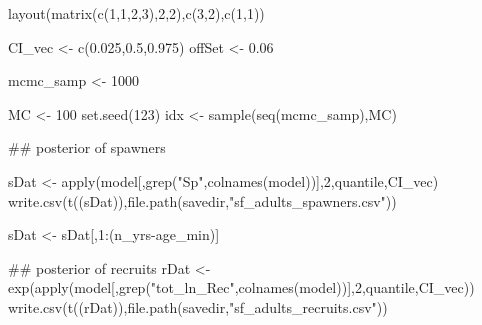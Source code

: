 \documentclass[
  11pt,
]{article}
\newenvironment{Shaded}{}{}
\newcommand{\CommentTok}[1]{\textcolor[rgb]{0.00,0.50,0.00}{#1}}
\newcommand{\DecValTok}[1]{#1}
\newcommand{\FloatTok}[1]{#1}
\newcommand{\KeywordTok}[1]{\textcolor[rgb]{0.00,0.00,1.00}{#1}}
\newcommand{\NormalTok}[1]{#1}
\newcommand{\OperatorTok}[1]{#1}
\newcommand{\StringTok}[1]{\textcolor[rgb]{0.00,0.50,0.50}{#1}}
\begin{document}
\begin{Shaded}
\begin{Highlighting}[]
\KeywordTok{layout}\NormalTok{(}\KeywordTok{matrix}\NormalTok{(}\KeywordTok{c}\NormalTok{(}\DecValTok{1}\NormalTok{,}\DecValTok{1}\NormalTok{,}\DecValTok{2}\NormalTok{,}\DecValTok{3}\NormalTok{),}\DecValTok{2}\NormalTok{,}\DecValTok{2}\NormalTok{),}\KeywordTok{c}\NormalTok{(}\DecValTok{3}\NormalTok{,}\DecValTok{2}\NormalTok{),}\KeywordTok{c}\NormalTok{(}\DecValTok{1}\NormalTok{,}\DecValTok{1}\NormalTok{))}


\NormalTok{CI_vec <-}\StringTok{ }\KeywordTok{c}\NormalTok{(}\FloatTok{0.025}\NormalTok{,}\FloatTok{0.5}\NormalTok{,}\FloatTok{0.975}\NormalTok{)}
\NormalTok{offSet <-}\StringTok{ }\FloatTok{0.06}

\NormalTok{mcmc_samp <-}\StringTok{ }\DecValTok{1000}

\NormalTok{MC <-}\StringTok{ }\DecValTok{100}
\KeywordTok{set.seed}\NormalTok{(}\DecValTok{123}\NormalTok{)}
\NormalTok{idx <-}\StringTok{ }\KeywordTok{sample}\NormalTok{(}\KeywordTok{seq}\NormalTok{(mcmc_samp),MC)}

\CommentTok{## posterior of spawners}

\NormalTok{sDat <-}\StringTok{ }\KeywordTok{apply}\NormalTok{(model[,}\KeywordTok{grep}\NormalTok{(}\StringTok{"Sp"}\NormalTok{,}\KeywordTok{colnames}\NormalTok{(model))],}\DecValTok{2}\NormalTok{,quantile,CI_vec)}
\KeywordTok{write.csv}\NormalTok{(}\KeywordTok{t}\NormalTok{((sDat)),}\KeywordTok{file.path}\NormalTok{(savedir,}\StringTok{"sf_adults_spawners.csv"}\NormalTok{))}

\NormalTok{sDat <-}\StringTok{ }\NormalTok{sDat[,}\DecValTok{1}\OperatorTok{:}\NormalTok{(n_yrs}\OperatorTok{-}\NormalTok{age_min)]}

\CommentTok{## posterior of recruits}
\NormalTok{rDat <-}\StringTok{ }\KeywordTok{exp}\NormalTok{(}\KeywordTok{apply}\NormalTok{(model[,}\KeywordTok{grep}\NormalTok{(}\StringTok{"tot_ln_Rec"}\NormalTok{,}\KeywordTok{colnames}\NormalTok{(model))],}\DecValTok{2}\NormalTok{,quantile,CI_vec))}
\KeywordTok{write.csv}\NormalTok{(}\KeywordTok{t}\NormalTok{((rDat)),}\KeywordTok{file.path}\NormalTok{(savedir,}\StringTok{"sf_adults_recruits.csv"}\NormalTok{))}


\end{Highlighting}
\end{Shaded}
\end{document}
